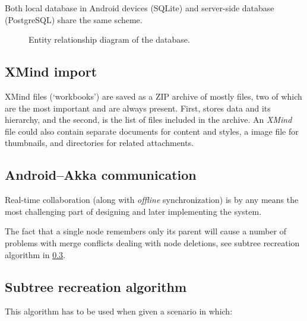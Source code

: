 Both local database in Android devices (SQLite) and server-side database (PostgreSQL) share the same scheme.

\begin{figure}[h]
	\centering
	\caption{Entity relationship diagram of the database.}
	\label{fig:erd}
\end{figure}

\subsection{XMind import}
\label{subsec:xmind-exchange}

XMind files (`workbooks') are saved as a ZIP archive of mostly  files, two of which are the most important and are always present. First,  stores data and its hierarchy, and the second,  is the list of files included in the archive. An {\em XMind} file could also contain separate  documents for content and styles, a  image file for thumbnails, and directories for related attachments. \cite{XMind:2009:Format}


\subsection{Android--Akka communication}
\label{subsec:android-akka-comm}

Real-time collaboration (along with \emph{offline} synchronization) is by any means the most challenging part of designing and later implementing the system.


The fact that a single node remembers only its parent will cause a number of problems with merge conflicts dealing with node deletions, see subtree recreation algorithm in \cref{subsec:subtree-recreation}.

\subsection{Subtree recreation algorithm}
\label{subsec:subtree-recreation}

This algorithm has to be used when given a scenario in which:

